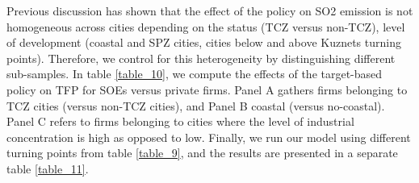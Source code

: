 \documentclass[12pt]{article}
\begin{document}
Previous discussion has shown that the effect of the policy on SO2 emission is not homogeneous across cities depending on the status (TCZ versus non-TCZ), level of development (coastal and SPZ cities, cities below and above Kuznets turning points). Therefore, we control for this heterogeneity by distinguishing different sub-samples. In table \ref{table_10}, we compute the effects of the target-based policy on TFP for SOEs versus private firms. Panel A gathers firms belonging to TCZ cities (versus non-TCZ cities), and Panel B coastal (versus no-coastal). Panel C refers to firms belonging to cities where the level of industrial concentration is high as opposed to low. Finally, we run our model using different turning points from table \ref{table_9}, and the results are presented in a separate table \ref{table_11}. 
\end{document}
